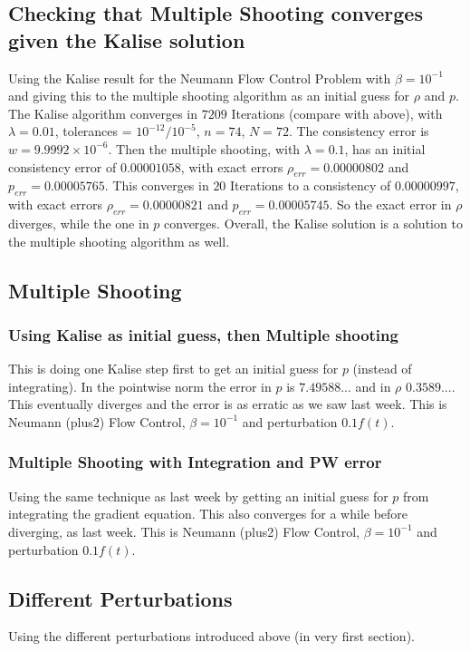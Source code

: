 \documentclass[11pt, a4paper]{article}
\theoremstyle{definition}
\begin{document}
\subsection*{Checking that Multiple Shooting converges given the Kalise solution}
Using the Kalise result for the Neumann Flow Control Problem with $\beta =10^{-1}$ and giving this to the multiple shooting algorithm as an initial guess for $\rho$ and $p$. The Kalise algorithm converges in $7209$ Iterations (compare with above), with $\lambda =0.01$, tolerances = $10^{-12} / 10^{-5}$, $n=74$, $N = 72$. The consistency error is $w = 9.9992 \times 10^{-6}$.
Then the multiple shooting, with $\lambda = 0.1$, has an initial consistency error of $0.00001058$, with exact errors $\rho_{err} = 0.00000802$ and $p_{err} = 0.00005765$. This converges in $20$ Iterations to a consistency of $0.00000997$, with exact errors $\rho_{err} = 0.00000821$ and $p_{err} = 0.00005745$. So the exact error in $\rho$ diverges, while the one in $p$ converges. Overall, the Kalise solution is a solution to the multiple shooting algorithm as well.


\subsection*{Multiple Shooting}
\subsubsection*{Using Kalise as initial guess, then Multiple shooting}
This is doing one Kalise step first to get an initial guess for $p$ (instead of integrating). In the pointwise norm the error in $p$ is $7.49588...$ and in $\rho$  $0.3589...$. This eventually diverges and the error is as erratic as we saw last week. This is Neumann (plus2) Flow Control, $\beta = 10^{-1}$ and perturbation $0.1 f(t)$.
\subsubsection*{Multiple Shooting with Integration and PW error}
Using the same technique as last week by getting an initial guess for $p$ from integrating the gradient equation. This also converges for a while before diverging, as last week.
This is Neumann (plus2) Flow Control, $\beta = 10^{-1}$ and perturbation $0.1 f(t)$.



\subsection*{Different Perturbations}
Using the different perturbations introduced above (in very first section).
\end{document}
